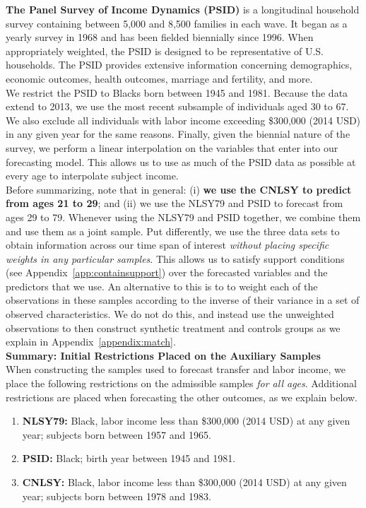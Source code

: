 \noindent\textbf{The Panel Survey of Income Dynamics (PSID)} is a longitudinal household survey containing between 5,000 and 8,500 families in each wave. It began as a yearly survey in 1968 and has been fielded biennially since 1996. When appropriately weighted, the PSID is designed to be representative of U.S. households. The PSID provides extensive information concerning demographics, economic outcomes, health outcomes, marriage and fertility, and more.\\

\noindent We restrict the PSID to Blacks born between 1945 and 1981. Because the data extend to 2013, we use the most recent subsample of individuals aged 30 to 67. We also exclude all individuals with labor income exceeding \$300,000 (2014 USD) in any given year for the same reasons. Finally, given the biennial nature of the survey, we perform a linear interpolation on the variables that enter into our forecasting model. This allows us to use as much of the PSID data as possible at every age to interpolate subject income.\\

\noindent Before summarizing, note that in general: (i) \textbf{we use the CNLSY to predict from ages 21 to 29}; and (ii) we use the NLSY79 and PSID to forecast from ages 29 to 79. Whenever using the NLSY79 and PSID together, we combine them and use them as a joint sample. Put differently, we use the three data sets to obtain information across our time span of interest \textit{without placing specific weights in any particular samples}. This allows us to satisfy support conditions (see Appendix~\ref{app:containsupport}) over the forecasted variables and the predictors that we use. An alternative to this is to to weight each of the observations in these samples according to the inverse of their variance in a set of observed characteristics. We do not do this, and instead use the unweighted observations to then construct synthetic treatment and controls groups as we explain in Appendix~\ref{appendix:match}.\\

\noindent \textbf{Summary: Initial Restrictions Placed on the Auxiliary Samples}\\
When constructing the samples used to forecast transfer and labor income, we place the following restrictions on the admissible samples \textit{for all ages}. Additional restrictions are placed when forecasting the other outcomes, as we explain below.
\begin{enumerate}
\item \textbf{NLSY79:} Black, labor income less than \$300,000 (2014 USD) at any given year; subjects born between 1957 and 1965.
\item \textbf{PSID:} Black; birth year between 1945 and 1981.
\item \textbf{CNLSY:} Black, labor income less than \$300,000 (2014 USD) at any given year; subjects born between 1978 and 1983.
\end{enumerate}

